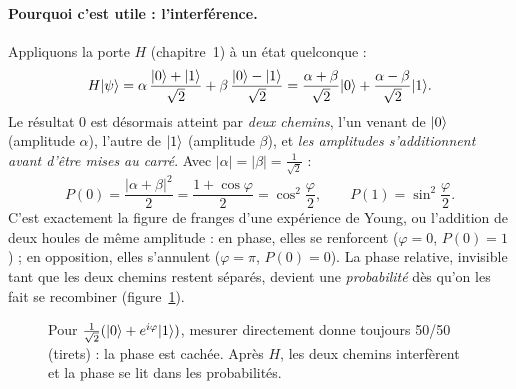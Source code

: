 \paragraph{Pourquoi c'est utile : l'interférence.} Appliquons la porte $H$ (chapitre~1) à un état quelconque :
\[
H\lvert \psi\rangle=\alpha\,\frac{\lvert 0\rangle+\lvert 1\rangle}{\sqrt2}+\beta\,\frac{\lvert 0\rangle-\lvert 1\rangle}{\sqrt2}
=\frac{\alpha+\beta}{\sqrt2}\lvert 0\rangle+\frac{\alpha-\beta}{\sqrt2}\lvert 1\rangle .
\]
Le résultat 0 est désormais atteint par \emph{deux chemins}, l'un venant de $\lvert 0\rangle$ (amplitude $\alpha$), l'autre de $\lvert 1\rangle$ (amplitude $\beta$), et \emph{les amplitudes s'additionnent avant d'être mises au carré}. Avec $|\alpha|=|\beta|=\tfrac1{\sqrt2}$ :
\[
P(0)=\frac{|\alpha+\beta|^2}{2}=\frac{1+\cos\varphi}{2}=\cos^2\frac\varphi2,\qquad P(1)=\sin^2\frac\varphi2 .
\]
C'est exactement la figure de franges d'une expérience de Young, ou l'addition de deux houles de même amplitude : en phase, elles se renforcent ($\varphi=0$, $P(0)=1$) ; en opposition, elles s'annulent ($\varphi=\pi$, $P(0)=0$). La phase relative, invisible tant que les deux chemins restent séparés, devient une \emph{probabilité} dès qu'on les fait se recombiner (figure~\ref{fig:interference}).

\begin{figure}[htbp]
\centering
{}
\caption{Pour $\tfrac1{\sqrt2}(\lvert 0\rangle+e^{i\varphi}\lvert 1\rangle)$, mesurer directement donne toujours 50/50 (tirets) : la phase est cachée. Après $H$, les deux chemins interfèrent et la phase se lit dans les probabilités.}\label{fig:interference}
\end{figure}

